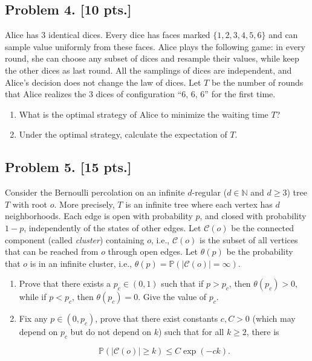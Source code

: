 \documentclass[11pt,a4paper]{article}
\begin{document}
\subsection{Problem 4. [10 pts.]}
Alice has 3 identical dices. Every dice has faces marked \( \{1, 2, 3, 4, 5, 6\} \) and can sample value uniformly from these faces. Alice plays the following game: in every round, she can choose any subset of dices and resample their values, while keep the other dices as last round. All the samplings of dices are independent, and Alice's decision does not change the law of dices. Let \( T \) be the number of rounds that Alice realizes the 3 dices of configuration ``6, 6, 6'' for the first time.
\begin{enumerate}[label=(\alph*)]
    \item What is the optimal strategy of Alice to minimize the waiting time \( T \)?
    \item Under the optimal strategy, calculate the expectation of \( T \).
\end{enumerate}

\subsection{Problem 5. [15 pts.]}
Consider the Bernoulli percolation on an infinite \( d \)-regular (\( d \in \mathbb{N} \) and \( d \ge 3 \)) tree \( T \) with root \( o \). More precisely, \( T \) is an infinite tree where each vertex has \( d \) neighborhoods. Each edge is open with probability \( p \), and closed with probability \( 1 - p \), independently of the states of other edges. Let \( \mathcal{C}(o) \) be the connected component (called \emph{cluster}) containing \( o \), i.e., \( \mathcal{C}(o) \) is the subset of all vertices that can be reached from \( o \) through open edges. Let \( \theta(p) \) be the probability that \( o \) is in an infinite cluster, i.e., \( \theta(p) = \mathbb{P}(|\mathcal{C}(o)| = \infty) \).
\begin{enumerate}[label=(\alph*)]
    \item Prove that there exists a \( p_c \in (0, 1) \) such that if \( p > p_c \), then \( \theta(p_c) > 0 \), while if \( p < p_c \), then \( \theta(p_c) = 0 \). Give the value of \( p_c \).
    \item Fix any \( p \in (0, p_c) \), prove that there exist constants \( c, C > 0 \) (which may depend on \( p_c \) but do not depend on \( k \)) such that for all \( k \ge 2 \), there is

    \[
    \mathbb{P}(|\mathcal{C}(o)| \ge k) \le C \exp(-ck).
    \]
\end{enumerate}
\end{document}
